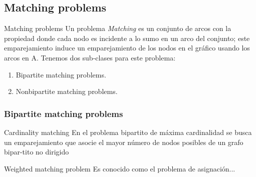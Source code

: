 \documentclass{beamer}
\begin{document}
\subsection{Matching problems}

\begin{frame}{Matching problems}
Un problema {\textit{Matching}} es un conjunto de arcos con la propiedad donde cada nodo es incidente a lo sumo en un arco del conjunto; este emparejamiento induce un emparejamiento de los nodos en el gráfico usando los arcos en A.  \newline Tenemos dos sub-clases para este problema:
\begin{enumerate}
 \item Bipartite matching problems.
 \item Nonbipartite matching problems.
\end{enumerate}

\end{frame}

\subsubsection{Bipartite matching problems}

\begin{frame}{Cardinality matching}
En el problema bipartito de máxima cardinalidad se
busca un emparejamiento que asocie el mayor número de nodos posibles de un grafo bipar-tito no dirigido
\end{frame}

\begin{frame}{Weighted matching problem}
Es conocido como el problema de asignación... 
\end{frame}
\end{document}
